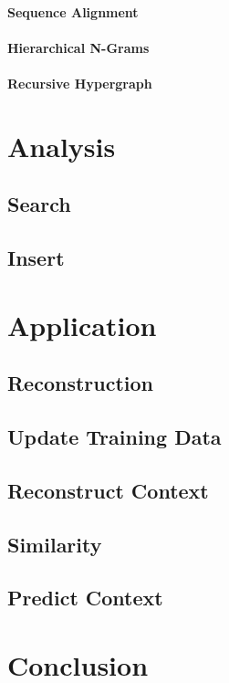\documentclass[10pt]{report}
\begin{document}
\paragraph{Sequence Alignment}
\paragraph{Hierarchical N-Grams}
\paragraph{Recursive Hypergraph}
\newpage



\section{Analysis}
\subsection{Search}
\subsection{Insert}

\section{Application}
\subsection{Reconstruction}
\subsection{Update Training Data}
\subsection{Reconstruct Context}
\subsection{Similarity}
\subsection{Predict Context}

\section{Conclusion}




\end{document}
